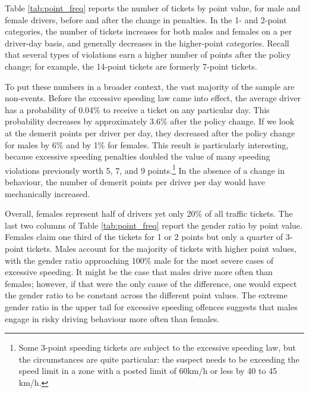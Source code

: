 

Table \ref{tab:point_freq} reports 
the number of tickets by point value, 
for male and female drivers, before and after the
change in penalties. 
%
In the 1- and 2-point categories, the number of tickets increases 
for both males and females on a per driver-day basis, 
and generally decreases in the higher-point categories. 
% 
Recall that several types of violations
earn a higher number of points after the policy change; 
for example, 
the 14-point tickets are formerly 7-point tickets.

To put these numbers in a broader context, 
the vast majority of the sample are non-events. 
Before the excessive speeding law came into effect, 
the average driver has a probability of 0.04\% to receive a ticket 
on any particular day. 
This probability decreases by approximately 3.6\% after the policy change. 
If we look at the demerit points per driver per day, 
they decreased after the policy change for males by 6\% and by 1\% for females. 
This result is particularly interesting, 
because excessive speeding penalties doubled the value of many 
speeding violations previously worth 5, 7, and 9 points.\footnote{%
Some 3-point speeding tickets are subject to the excessive speeding law, 
but the circumstances are quite particular: 
the suspect needs to be exceeding the speed limit in a zone 
with a posted limit of 60km/h or less by 40 to 45 km/h.}
In the absence of a change in behaviour, 
the number of demerit points per driver per day 
would have mechanically increased. 


Overall, females represent half of drivers 
yet only 20\% of all traffic tickets. 
%
The last two columns of
Table \ref{tab:point_freq}
report the gender ratio by point value.
% 
Females claim one third of the tickets for 1 or 2 points
but only a quarter of 3-point tickets. 
Males account for the majority of tickets with higher point values, 
with the gender ratio approaching 100\% male 
for the most severe cases of excessive speeding. 
% 
It might be the case that males drive more often than females; 
however, if that were the only cause of the difference, one would 
expect the gender ratio to be constant across the different point values. 
%
The extreme gender ratio in the upper tail for excessive speeding offences 
suggests that males engage in risky driving behaviour 
more often than females. 


